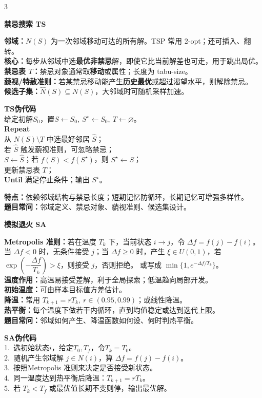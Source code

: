 \documentclass[8pt,a4paper]{ctexart}
\newcommand{\blk}[1]{%
  \par\needspace{2.2\baselineskip}%
  \vspace{1pt}\noindent
  \colorbox{black!10}{\parbox{\dimexpr\columnwidth-2\fboxsep\relax}{\textbf{#1}}}\par
  \vspace{1pt}}
\newcommand{\codebox}[1]{\begin{tcolorbox}#1\end{tcolorbox}}
\begin{document}
\begin{multicols*}{3}
\blk{禁忌搜索 TS}
\textbf{邻域：}$N(S)$ 为一次邻域移动可达的所有解。TSP 常用 2-opt；还可插入、翻转。\\
\textbf{核心：}每步从邻域中选\textbf{最优非禁忌}解，即使它比当前解差也可走，用于跳出局优。\\
\textbf{禁忌表 $T$：}禁忌对象通常取\textbf{移动}或属性；长度为 tabu-size。\\
\textbf{藐视/特赦准则：}若某禁忌移动能产生\textbf{历史最优}或超过渴望水平，则解除禁忌。\\
\textbf{候选子集：}$\hat N(S)\subseteq N(S)$，大邻域时可随机采样加速。\\
\codebox{
\textbf{TS伪代码}\\
给定初解$S_0$，置$S\leftarrow S_0,\ S^\star\leftarrow S_0,\ T\leftarrow\varnothing$。\\
\textbf{Repeat}\\
\quad 从 $N(S)\setminus T$ 中选最好邻居 $\hat S$；\\
\quad 若 $\hat S$ 触发藐视准则，可忽略禁忌；\\
\quad $S\leftarrow \hat S$；若 $f(S)<f(S^\star)$，则 $S^\star\leftarrow S$；\\
\quad 更新禁忌表 $T$；\\
\textbf{Until} 满足停止条件；输出 $S^\star$。
}
\textbf{特点：}依赖邻域结构与禁忌长度；短期记忆防循环，长期记忆可增强多样性。\\
\textbf{题目常问：}邻域定义、禁忌对象、藐视准则、候选集设计。

\blk{模拟退火 SA}
\textbf{Metropolis 准则：}若在温度 $T_k$ 下，当前状态 $i\to j$，令 $\Delta f=f(j)-f(i)$。当 $\Delta f<0$ 时，无条件接受 $j$；当 $\Delta f\ge 0$ 时，产生 $\xi\in U(0,1)$，若 $\exp\!\left(-\dfrac{\Delta f}{T_k}\right)>\xi$，则接受 $j$，否则拒绝。
或写成 $\min\{1,e^{-\Delta f/T_k}\}$。\\
\textbf{温度作用：}高温易接受差解，利于全局探索；低温趋向局部开发。\\
\textbf{初始温度：}可由样本目标值方差估计。\\
\textbf{降温：}常用 $T_{k+1}=rT_k,\ r\in(0.95,0.99)$；或线性降温。\\
\textbf{热平衡：}每个温度下做若干内循环，直到均值稳定或达到迭代上限。\\
\textbf{题目常问：}邻域如何产生、降温函数如何设、何时判热平衡。\\
\codebox{
\textbf{SA伪代码}\\
1.\ 选初始状态$i$，给定$T_0,T_f$，令$T_k=T_0$。\\
2.\ 随机产生邻域解 $j\in N(i)$，算 $\Delta f=f(j)-f(i)$。\\
3.\ 按照Metropolis 准则来决定是否接受新状态。\\
4.\ 同一温度达到热平衡后降温：$T_{k+1}=rT_k$。\\
5.\ 若 $T_k<T_f$ 或最优值长期不变则停，输出最优解。
}


\end{multicols*}
\end{document}
